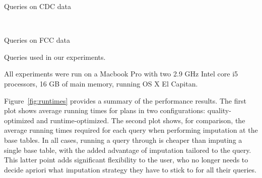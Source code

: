 \begin{table}
\centering
 \begin{subtable}{\linewidth}
  
  \caption{Queries on CDC data}
  \label{fig:queries-cdc}
 \end{subtable}
 ~
 \begin{subtable}{\linewidth}
 
 \caption{Queries on FCC data}
 \label{fig:queries-fcc}
 \end{subtable}
  \caption{Queries used in our experiments.}
  \label{fig:queries}
\end{table}

%  

All experiments were run on a Macbook Pro with two 2.9 GHz Intel core i5 processors, 16 GB of main memory,  running OS X El Capitan.

Figure~\ref{fig:runtimes} provides a summary of the performance results. The first plot shows average running times for \ProjectName{}
plans in two configurations: quality-optimized and runtime-optimized. The second plot shows, for comparison, the 
average running times required for each query when performing imputation at the base tables.
In all cases, running a query through \ProjectName{} is cheaper than 
imputing a single base table, with the added advantage of imputation tailored to the query. This latter point adds
significant flexibility to the user, who no longer needs to decide apriori what imputation strategy they have to stick to
for all their queries.


